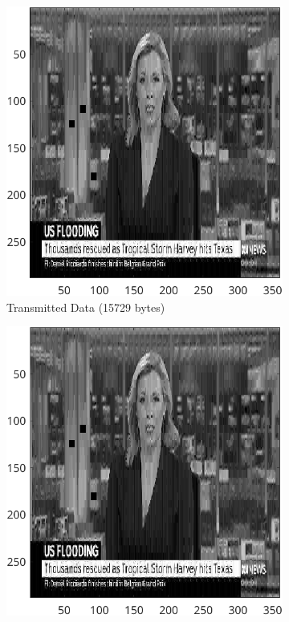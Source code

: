 \documentclass{article}
\begin{document}
	\begin{figure}[ht]
		\centering
			\begin{subfigure}[t]{0.45\textwidth}
			\centering

			\includegraphics[width=\textwidth]{2B_Input2TD}

			\caption{Transmitted Data (15729 bytes)}
			\label{fig:2B_Input2TD}

		\end{subfigure}
		\hspace{1cm}
		\begin{subfigure}[t]{0.45\textwidth}
			\centering

			\includegraphics[width=\textwidth]{2B_Input2Reconstructed}


\end{subfigure}
\end{figure}
\end{document}
